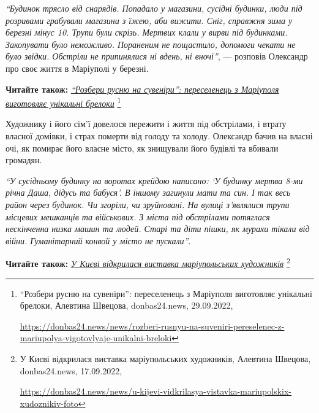 \begin{leftbar}
\emph{\enquote{Будинок трясло від снарядів. Попадало у магазини, сусідні будинки, люди під
розривами грабували магазини з їжею, аби вижити. Сніг, справжня зима у березні
мінус 10. Трупи були скрізь. Мертвих клали у вирви під будинками. Закопувати
було неможливо. Пораненим не пощастило, допомоги чекати не було звідки.
Обстріли не припинялися ні вдень, ні вночі}}, — розповів Олександр про своє
життя в Маріуполі у березні.
\end{leftbar}

\textbf{Читайте також:} \href{https://donbas24.news/news/rozberi-rusnyu-na-suveniri-pereselenec-z-mariupolya-vigotovlyaje-unikalni-breloki}{\emph{\enquote{Розбери русню на сувеніри}: переселенець з Маріуполя виготовляє унікальні брелоки}}%
\footnote{\enquote{Розбери русню на сувеніри}: переселенець з Маріуполя виготовляє унікальні брелоки, Алевтина Швецова, donbas24.news, 29.09.2022, \par%
\url{https://donbas24.news/news/rozberi-rusnyu-na-suveniri-pereselenec-z-mariupolya-vigotovlyaje-unikalni-breloki}%
}


Художнику і його сім'ї довелося пережити і життя під обстрілами, і втрату
власної домівки, і страх померти від голоду та холоду. Олександр бачив на
власні очі, як помирає його власне місто, як знищували його будівлі та вбивали
громадян.

\begin{leftbar}
\emph{\enquote{У сусідньому будинку на воротах крейдою написано: \enquote{У будинку мертва 8-ми
річна Даша, дідусь та бабуся}. В іншому загинули мати та син. І так
весь район через будинок. Чи згоріли, чи зруйновані. На вулиці
з'являлися трупи місцевих мешканців та військових. З міста під
обстрілами потяглася нескінченна низка машин та людей. Старі та діти
пішки, як мурахи тікали від війни. Гуманітарний конвой у місто не
пускали}}.
\end{leftbar}


\textbf{Читайте також:} \href{https://donbas24.news/news/u-kijevi-vidkrilasya-vistavka-mariupolskix-xudoznikiv-foto}{\emph{У Києві відкрилася виставка маріупольських художників}}%
\footnote{У Києві відкрилася виставка маріупольських художників, Алевтина Швецова, donbas24.news, 17.09.2022, \par%
\url{https://donbas24.news/news/u-kijevi-vidkrilasya-vistavka-mariupolskix-xudoznikiv-foto}%
}

